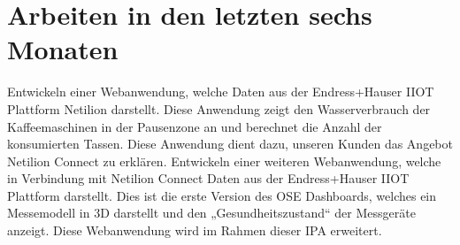\section{Arbeiten in den letzten sechs Monaten}
Entwickeln einer Webanwendung, welche Daten aus der Endress+Hauser IIOT Plattform Netilion darstellt. Diese Anwendung zeigt den Wasserverbrauch der Kaffeemaschinen in der Pausenzone an und berechnet die Anzahl der konsumierten Tassen. Diese Anwendung dient dazu, unseren Kunden das Angebot Netilion Connect zu erklären.
\newline
Entwickeln einer weiteren Webanwendung, welche in Verbindung mit Netilion Connect Daten aus der Endress+Hauser IIOT Plattform darstellt. Dies ist die erste Version des OSE Dashboards, welches ein Messemodell in 3D darstellt und den „Gesundheitszustand“ der Messgeräte anzeigt. Diese Webanwendung wird im Rahmen dieser IPA erweitert.